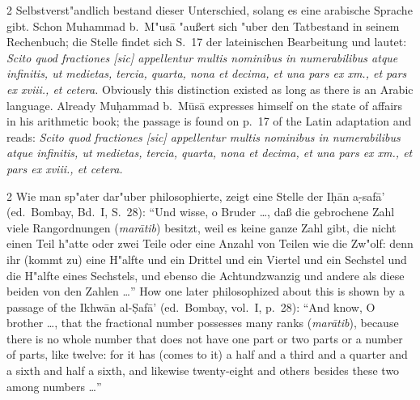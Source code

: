 \documentclass[10pt,a4paper]{article}
\renewcommand{\switchcolumn}{\syncronize\nointerlineskip\columnbreak}
\newcommand{\s}[1]{\d{#1}}
\newcommand{\hw}{\d{h}}
\newcommand{\enquote}[1]{``#1''}
\begin{document}
\begin{paracol}{2}
Selbstverst"andlich bestand dieser Unterschied, solang es eine arabische Sprache gibt. Schon Muhammad b.\ M"us\=a "au\ss{}ert sich "uber den Tatbestand in seinem Rechenbuch; die Stelle findet sich S.\ 17 der lateinischen Bearbeitung und lautet: \textit{Scito quod fractiones [sic] appellentur multis nominibus in numerabilibus atque infinitis, ut medietas, tercia, quarta, nona et decima, et una pars ex xm., et pars ex xviii., et cetera.}
\switchcolumn
Obviously this distinction existed as long as there is an Arabic language. Already Mu\d{h}ammad b.\ M\=us\=a expresses himself on the state of affairs in his arithmetic book; the passage is found on p.\ 17 of the Latin adaptation and reads: \textit{Scito quod fractiones [sic] appellentur multis nominibus in numerabilibus atque infinitis, ut medietas, tercia, quarta, nona et decima, et una pars ex xm., et pars ex xviii., et cetera.}
\end{paracol}

\begin{paracol}{2}
Wie man sp"ater dar"uber philosophierte, zeigt eine Stelle der I\hw{}\=an a\s-s{}af\=a' (ed.\ Bombay, Bd.\ I, S.\ 28): \enquote{Und wisse, o Bruder \ldots{}, da\ss{} die gebrochene Zahl viele Rangordnungen (\textit{mar\=atib}) besitzt, weil es keine ganze Zahl gibt, die nicht einen Teil h"atte oder zwei Teile oder eine Anzahl von Teilen wie die Zw"olf: denn ihr (kommt zu) eine H"alfte und ein Drittel und ein Viertel und ein Sechstel und die H"alfte eines Sechstels, und ebenso die Achtundzwanzig und andere als diese beiden von den Zahlen \ldots{}}
\switchcolumn
How one later philosophized about this is shown by a passage of the Ikhw\=an al-\d{S}af\=a' (ed.\ Bombay, vol.\ I, p.\ 28): ``And know, O brother \ldots{}, that the fractional number possesses many ranks (\textit{mar\=atib}), because there is no whole number that does not have one part or two parts or a number of parts, like twelve: for it has (comes to it) a half and a third and a quarter and a sixth and half a sixth, and likewise twenty-eight and others besides these two among numbers \ldots{}''
\end{paracol}
\end{document}
